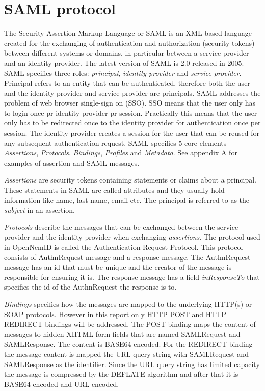 \documentclass[twosided]{report}
\begin{document}
\section{SAML protocol}
The Security Assertion Markup Language or SAML is an XML based language created for the exchanging of authentication and authorization (security tokens) between different systems or domains, in particular between a service provider and an identity provider. The latest version of SAML is 2.0 released in 2005. SAML specifies three roles: \emph{principal}, \emph{identity provider} and \emph{service provider}. Principal refers to an entity that can be authenticated, therefore both the user and the identity provider and service provider are principals. SAML addresses the problem of web browser single-sign on (SSO). SSO means that the user only has to login once pr identity provider pr session. Practically this means that the user only has to be redirected once to the identity provider for authentication once per session. The identity provider creates a session for the user that can be reused for any subsequent authentication request. SAML specifies 5 core elements - \emph{Assertions}, \emph{Protocols}, \emph{Bindings}, \emph{Profiles} and \emph{Metadata}. See appendix A for examples of assertion and SAML messages.
\par
\emph{Assertions} are security tokens containing statements or claims about a principal. These statements in SAML are called attributes and they usually hold information like name, last name, email etc. The principal is referred to as the \emph{subject} in an assertion.
\par
\emph{Protocols} describe the messages that can be exchanged between the service provider and the identity provider when exchanging \emph{assertions}. The protocol used in OpenNemID is called the Authentication Request Protocol. This protocol consists of AuthnRequest message and a response message. The AuthnRequest message has an id that must be unique and the creator of the message is responsible for ensuring it is. The response message has a field \emph{inResponseTo} that specifies the id of the AuthnRequest the response is to.
\par
\emph{Bindings} specifies how the messages are mapped to the underlying HTTP(s) or SOAP protocols. However in this report only HTTP POST and HTTP REDIRECT bindings will be addressed. The POST binding maps the content of messages to hidden XHTML form fields that are named SAMLRequest and SAMLResponse. The content is BASE64 encoded. For the REDIRECT binding the message content is mapped the URL query string with SAMLRequest and SAMLResponse as the identifier. Since the URL query string has limited capacity the message is compressed by the DEFLATE algorithm and after that it is BASE64 encoded and URL encoded.
\end{document}
